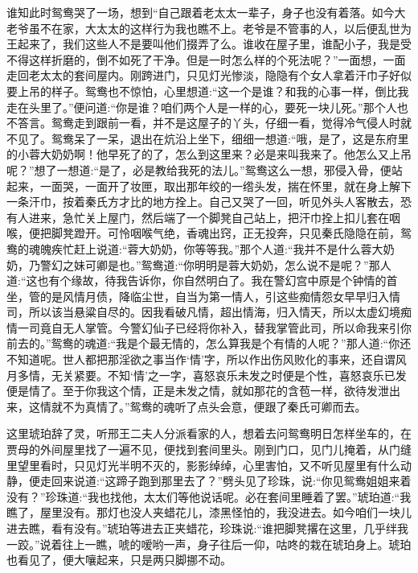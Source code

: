 \begin{parag}
    谁知此时鸳鸯哭了一场，想到“自己跟着老太太一辈子，身子也没有着落。如今大老爷虽不在家，大太太的这样行为我也瞧不上。老爷是不管事的人，以后便乱世为王起来了，我们这些人不是要叫他们掇弄了么。谁收在屋子里，谁配小子，我是受不得这样折磨的，倒不如死了干净。但是一时怎么样的个死法呢？”一面想，一面走回老太太的套间屋内。刚跨进门，只见灯光惨淡，隐隐有个女人拿着汗巾子好似要上吊的样子。鸳鸯也不惊怕，心里想道:“这一个是谁？和我的心事一样，倒比我走在头里了。”便问道:“你是谁？咱们两个人是一样的心，要死一块儿死。”那个人也不答言。鸳鸯走到跟前一看，并不是这屋子的丫头，仔细一看，觉得冷气侵人时就不见了。鸳鸯呆了一呆，退出在炕沿上坐下，细细一想道:“哦，是了，这是东府里的小蓉大奶奶啊！他早死了的了，怎么到这里来？必是来叫我来了。他怎么又上吊呢？”想了一想道:“是了，必是教给我死的法儿。”鸳鸯这么一想，邪侵入骨，便站起来，一面哭，一面开了妆匣，取出那年绞的一绺头发，揣在怀里，就在身上解下一条汗巾，按着秦氏方才比的地方拴上。自己又哭了一回，听见外头人客散去，恐有人进来，急忙关上屋门，然后端了一个脚凳自己站上，把汗巾拴上扣儿套在咽喉，便把脚凳蹬开。可怜咽喉气绝，香魂出窍，正无投奔，只见秦氏隐隐在前，鸳鸯的魂魄疾忙赶上说道:“蓉大奶奶，你等等我。”那个人道:“我并不是什么蓉大奶奶，乃警幻之妹可卿是也。”鸳鸯道:“你明明是蓉大奶奶，怎么说不是呢？”那人道:“这也有个缘故，待我告诉你，你自然明白了。我在警幻宫中原是个钟情的首坐，管的是风情月债，降临尘世，自当为第一情人，引这些痴情怨女早早归入情司，所以该当悬粱自尽的。因我看破凡情，超出情海，归入情天，所以太虚幻境痴情一司竟自无人掌管。今警幻仙子已经将你补入，替我掌管此司，所以命我来引你前去的。”鸳鸯的魂道:“我是个最无情的，怎么算我是个有情的人呢？”那人道:“你还不知道呢。世人都把那淫欲之事当作‘情’字，所以作出伤风败化的事来，还自谓风月多情，无关紧要。不知‘情’之一字，喜怒哀乐未发之时便是个性，喜怒哀乐已发便是情了。至于你我这个情，正是未发之情，就如那花的含苞一样，欲待发泄出来，这情就不为真情了。”鸳鸯的魂听了点头会意，便跟了秦氏可卿而去。
\end{parag}


\begin{parag}
    这里琥珀辞了灵，听邢王二夫人分派看家的人，想着去问鸳鸯明日怎样坐车的，在贾母的外间屋里找了一遍不见，便找到套间里头。刚到门口，见门儿掩着，从门缝里望里看时，只见灯光半明不灭的，影影绰绰，心里害怕，又不听见屋里有什么动静，便走回来说道:“这蹄子跑到那里去了？”劈头见了珍珠，说:“你见鸳鸯姐姐来着没有？”珍珠道:“我也找他，太太们等他说话呢。必在套间里睡着了罢。”琥珀道:“我瞧了，屋里没有。那灯也没人夹蜡花儿，漆黑怪怕的，我没进去。如今咱们一块儿进去瞧，看有没有。”琥珀等进去正夹蜡花，珍珠说:“谁把脚凳撂在这里，几乎绊我一跤。”说着往上一瞧，唬的嗳哟一声，身子往后一仰，咕咚的栽在琥珀身上。琥珀也看见了，便大嚷起来，只是两只脚挪不动。
\end{parag}


